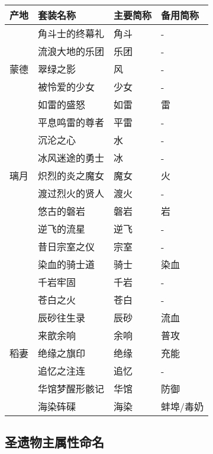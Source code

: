 \noindent\begin{tabu}{|c|X[c2.5]|X[c]|X[c]|}
	\hline
	{产地} & {套装名称}       & {主要简称} & {备用简称}  \\
	\hline
	{}     & {角斗士的终幕礼} & {角斗}     & {-}         \\
	{}     & {流浪大地的乐团} & {乐团}     & {-}         \\
	\hline
	{蒙德} & {翠绿之影}       & {风}       & {-}         \\
	{}     & {被怜爱的少女}   & {少女}     & {-}         \\
	{}     & {如雷的盛怒}     & {如雷}     & {雷}        \\
	{}     & {平息鸣雷的尊者} & {平雷}     & {-}         \\
	{}     & {沉沦之心}       & {水}       & {-}         \\
	{}     & {冰风迷途的勇士} & {冰}       & {-}         \\
	\hline
	{璃月} & {炽烈的炎之魔女} & {魔女}     & {火}        \\
	{}     & {渡过烈火的贤人} & {渡火}     & {-}         \\
	{}     & {悠古的磐岩}     & {磐岩}     & {岩}        \\
	{}     & {逆飞的流星}     & {逆飞}     & {-}         \\
	{}     & {昔日宗室之仪}   & {宗室}     & {-}         \\
	{}     & {染血的骑士道}   & {骑士}     & {染血}      \\
	{}     & {千岩牢固}       & {千岩}     & {-}         \\
	{}     & {苍白之火}       & {苍白}     & {-}         \\
	{}     & {辰砂往生录}     & {辰砂}     & {流血}      \\
	{}     & {来歆余响}       & {余响}     & {普攻}      \\
	\hline
	{稻妻} & {绝缘之旗印}     & {绝缘}     & {充能}      \\
	{}     & {追忆之注连}     & {追忆}     & {-}         \\
	{}     & {华馆梦醒形骸记} & {华馆}     & {防御}      \\
	{}     & {海染砗磲}       & {海染}     & {蚌埠/毒奶} \\
	\hline
\end{tabu}

\subsection{圣遗物主属性命名}

